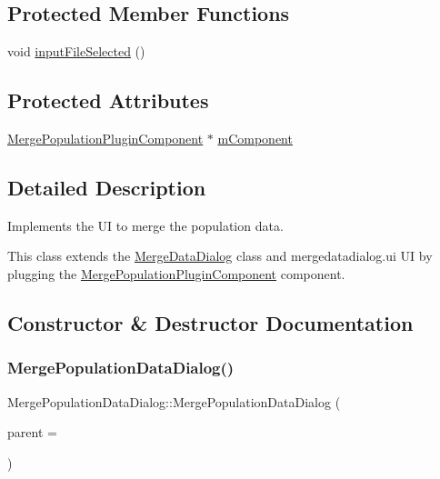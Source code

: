\subsection*{Protected Member Functions}
\begin{DoxyCompactItemize}
\item 
void \mbox{\hyperlink{class_merge_population_data_dialog_a1989c5920eac03cff9706d32a8dfeaaf}{input\+File\+Selected}} ()
\end{DoxyCompactItemize}
\subsection*{Protected Attributes}
\begin{DoxyCompactItemize}
\item 
\mbox{\hyperlink{class_merge_population_plugin_component}{Merge\+Population\+Plugin\+Component}} $\ast$ \mbox{\hyperlink{class_merge_population_data_dialog_a05afea9f8c00e28df7c8ac27496b03ff}{m\+Component}}
\end{DoxyCompactItemize}


\subsection{Detailed Description}
Implements the UI to merge the population data. 

This class extends the \mbox{\hyperlink{class_merge_data_dialog}{Merge\+Data\+Dialog}} class and mergedatadialog.\+ui UI by plugging the \mbox{\hyperlink{class_merge_population_plugin_component}{Merge\+Population\+Plugin\+Component}} component. 

\subsection{Constructor \& Destructor Documentation}
\mbox{\label{class_merge_population_data_dialog_a3b1200cfc75b281cabcdd15166ae454c}} 
\subsubsection{\texorpdfstring{MergePopulationDataDialog()}{MergePopulationDataDialog()}}
{\footnotesize\ttfamily Merge\+Population\+Data\+Dialog\+::\+Merge\+Population\+Data\+Dialog (\begin{DoxyParamCaption}\item[{Q\+Widget $\ast$}]{parent = {} }\end{DoxyParamCaption})\hspace{0.3cm}{\ttfamily [explicit]}}



